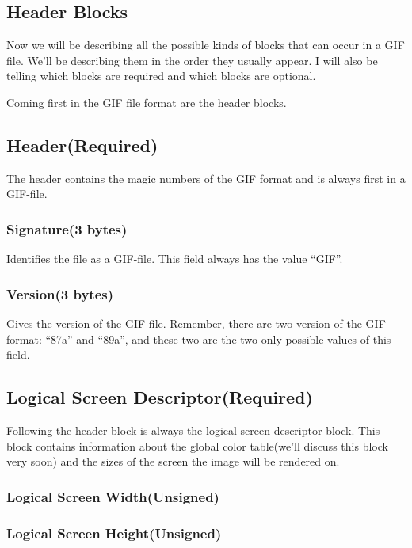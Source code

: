 \begin{refsection}
  \section{Header Blocks}

  Now we will be describing all the possible kinds of blocks that
  can occur in a GIF file. We'll be describing them in the order they
  usually appear. I will also be telling which blocks are required and
  which blocks are optional.

  Coming first in the GIF file format are the header blocks.

  \subsection{Header(Required)}

  The header contains the magic numbers of the GIF format and is always
  first in a GIF-file.

  \subsubsection*{Signature(3 bytes)}

  Identifies the file as a GIF-file. This field always has the value
  ``GIF''.

  \subsubsection{Version(3 bytes)}

  Gives the version of the GIF-file. Remember, there are two version
  of the GIF format: ``87a'' and ``89a'', and these two are the two
  only possible values of this field.

  \subsection{Logical Screen Descriptor(Required)}

  Following the header block is always the logical screen descriptor
  block. This block contains information about the global color
  table(we'll discuss this block very soon) and the sizes of the
  screen the image will be rendered on.

  \subsubsection{Logical Screen Width(Unsigned)}
  \subsubsection{Logical Screen Height(Unsigned)}


\end{refsection}
